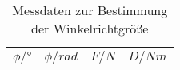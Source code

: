 \begin{table}[h!]
  \centering
  \caption{Messdaten zur Bestimmung der Winkelrichtgröße}
  \label{tab:WRG}
  \begin{tabular}{c c c c}
    \toprule
     $\phi/°$ & $\phi/rad$  &  $F/N$	&  $D/Nm$     \\
    \midrule
      
    \bottomrule
  \end{tabular}
\end{table}
